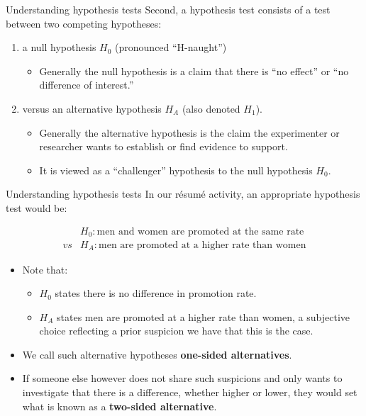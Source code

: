 \documentclass[
  ignorenonframetext,
]{beamer}
\providecommand{\tightlist}{%
  \setlength{\itemsep}{0pt}\setlength{\parskip}{0pt}}
\begin{document}
\begin{frame}{Understanding hypothesis tests}
\protect\hypertarget{understanding-hypothesis-tests-2}{}
Second, a hypothesis test consists of a test between two competing
hypotheses:

\begin{enumerate}
[(1)]
\item
  a null hypothesis \(H_0\) (pronounced ``H-naught'')

  \begin{itemize}
  \tightlist
  \item
    Generally the null hypothesis is a claim that there is ``no effect''
    or ``no difference of interest.''
  \end{itemize}
\item
  versus an alternative hypothesis \(H_A\) (also denoted \(H_1\)).

  \begin{itemize}
  \tightlist
  \item
    Generally the alternative hypothesis is the claim the experimenter
    or researcher wants to establish or find evidence to support.
  \item
    It is viewed as a ``challenger'' hypothesis to the null hypothesis
    \(H_0\).
  \end{itemize}
\end{enumerate}
\end{frame}

\begin{frame}{Understanding hypothesis tests}
\protect\hypertarget{understanding-hypothesis-tests-3}{}
In our résumé activity, an appropriate hypothesis test would be:

\[\begin{array}{ll}
&H_0: \text{men and women are promoted at the same rate}\\
vs&H_A: \text{men are promoted at a higher rate than women}
\end{array}\]

\begin{itemize}
\item
  Note that:

  \begin{itemize}
  \tightlist
  \item
    \(H_0\) states there is no difference in promotion rate.
  \item
    \(H_A\) states men are promoted at a higher rate than women, a
    subjective choice reflecting a prior suspicion we have that this is
    the case.
  \end{itemize}
\item
  We call such alternative hypotheses \textbf{one-sided alternatives}.
\item
  If someone else however does not share such suspicions and only wants
  to investigate that there is a difference, whether higher or lower,
  they would set what is known as a \textbf{two-sided alternative}.
\end{itemize}
\end{frame}
\end{document}
